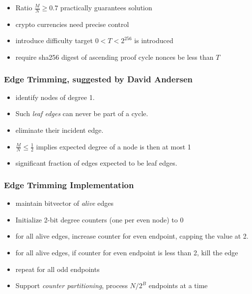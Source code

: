 \documentclass{beamer}
\begin{document}

\begin{frame}
\begin{itemize}
\frametitle{Difficulty control}
\item 
Ratio $\frac{M}{N} \geq 0.7$ practically guarantees solution
\item
crypto currencies need precise control


\item
introduce difficulty target $0 < T < 2^{256}$ is introduced
\item
require sha256 digest of ascending proof cycle nonces be less than $T$
\end{itemize}
\end{frame}

\begin{frame}
\frametitle{Edge Trimming, suggested by David Andersen}
\begin{itemize}
\item
identify nodes of degree 1.
\item 
Such {\em leaf edges} can never be part of a cycle.
\item
eliminate their incident edge.
\item $\frac{M}{N} \leq \frac{1}{2}$ implies expected degree of a node is then at most 1
\item
significant fraction of edges expected to be leaf edges.
\end{itemize}
\end{frame}

\begin{frame}
\frametitle{Edge Trimming Implementation}
\begin{itemize}
\item
maintain bitvector of {\em alive} edges
\item
Initialize 2-bit degree counters (one per even node) to 0
\item
for all alive edges, increase counter for even endpoint,
capping the value at 2.
\item
for all alive edges, if counter for even endpoint is less than 2,
kill the edge
\item repeat for all odd endpoints
\item 
Support {\em counter partitioning}, process $N / 2^{B}$ endpoints at a time
\end{itemize}
\end{frame}
\end{document}
